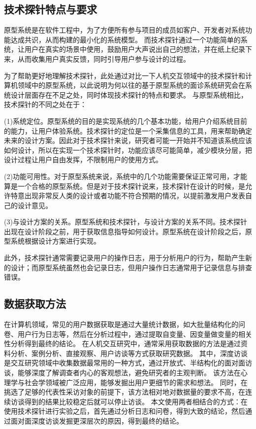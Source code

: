 \subsection{技术探针特点与要求}

原型系统是在软件工程中，为了方便所有参与项目的成员如客户、开发者对系统功能达成共识，从而构建的最小化的系统模型。
而技术探针通过一个功能简单的系统，让用户在真实的场景中使用，鼓励用户大声说出自己的想法，并在纸上纪录下来，从而收集用户真实反馈，同时引导用户参与设计的过程。

为了帮助更好地理解技术探针，此处通过对比一下人机交互领域中的技术探针和计算机领域中的原型系统，以此说明为何以往的基于原型系统的面诊系统研究会在系统设计层面存在不足之处，同时体现技术探针的特点和要求。
与原型系统相比，技术探针的不同之处在于：

(1)系统定位。原型系统的目的是实现系统的几个基本功能，给用户介绍系统目前的能力，让用户体验系统。技术探针的定位是一个采集信息的工具，用来帮助确定未来的设计方案。因此对于技术探针来说，研究者可能一开始并不知道该系统应该如何设计，所以在实现一个技术探针时，功能应该尽可能简单，减少模块分层，把设计过程让用户自由发挥，不限制用户的使用方式。

(2)功能可用性。对于原型系统来说，系统中的几个功能需要保证正常可用，才能算是一个合格的原型系统。但是对于技术探针说来，技术探针在设计的时候，是允许特意出现非常反人类的设计或者功能不符合预期的情况，以提前激发用户发表自己的设计意见。

(3)与设计方案的关系。原型系统和技术探针，与设计方案的关系不同。技术探针出现在设计阶段之前，用于获取信息指导如何设计。原型系统在设计阶段之后，原型系统根据设计方案进行实现。

此外，技术探针通常需要记录用户的操作日志，用于分析用户的行为，帮助产生新的设计；而原型系统虽然也会记录日志，但用户操作日志通常用于记录信息与排查错误。

\subsection{数据获取方法}
在计算机领域，常见的用户数据获取是通过大量统计数据，如大批量结构化的问卷、用户行为日志等，然后在分析过程中，通过提取自变量、因变量做变量的相关性分析得到最终的结论。
在人机交互研究中，通常采用获取数据的方法是通过资料分析、案例分析、直接观察、用户访谈等方式获取研究数据。
其中，深度访谈是交互研究领域中收集数据最常用的一种方式，通过开放式、半结构化的面对面访谈，能够深度了解调查者内心的客观想法，避免研究者的主观判断。
该方法在心理学与社会学领域被广泛应用，能够发掘出用户更细节的需求和想法。
同时，在挑选了足够的代表性采访对象的前提下，该方法相对地对数据量的要求不高，在连续访谈得到的结果比较稳定后就可以停止访谈\cite{cleary2014data}。
本文使用两者相结合的方式：在使用技术探针进行实验之后，首先通过分析日志和问卷，得到大致的结论，然后通过面对面深度访谈发掘更深层次的原因，得到最终的结论。

